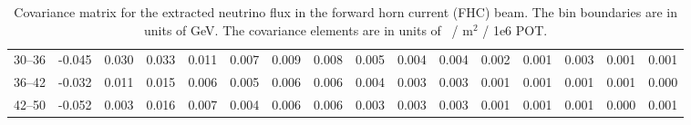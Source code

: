 \begin{table}[tb]
{\begin{tabular}{c|ccccccccccccccc}
    30--36 & -0.045 &  0.030 &  0.033 &  0.011 &  0.007 &  0.009 &  0.008 &  0.005 &  0.004 &  0.004 &  0.002 &  0.001 &  0.003 &  0.001 &  0.001 \\
    36--42 & -0.032 &  0.011 &  0.015 &  0.006 &  0.005 &  0.006 &  0.006 &  0.004 &  0.003 &  0.003 &  0.001 &  0.001 &  0.001 &  0.001 &  0.000 \\
    42--50 & -0.052 &  0.003 &  0.016 &  0.007 &  0.004 &  0.006 &  0.006 &  0.003 &  0.003 &  0.003 &  0.001 &  0.001 &  0.001 &  0.000 &  0.001 \\
    \hline
    \end{tabular} }
\caption{Covariance matrix for the extracted neutrino flux in the forward horn current (FHC) beam. The bin boundaries are in units of GeV. The covariance elements are in units of \numu~/ m$^2$ / 1e6 POT.}
\label{cov:FHC-nu-flux-NOMAD}
\end{table}

